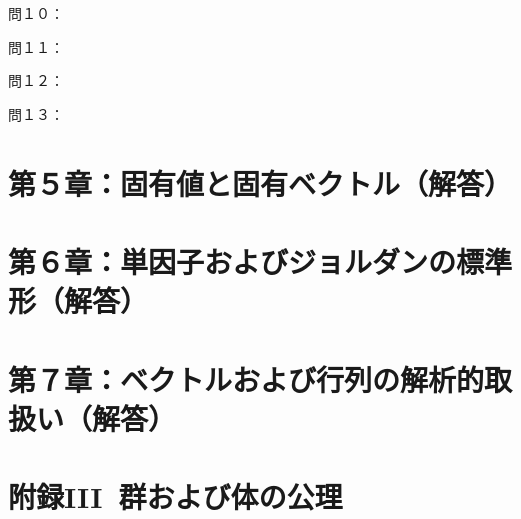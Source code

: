 \documentclass[dvipdfmx,uplatex,11pt]{jsarticle}
\begin{document}
%
%
%
\newpage
%
%
%
\noindent
問１０：




















%
%
%
\newpage
%
%
%
\noindent
問１１：





















%
%
%
\newpage
%
%
%
\noindent
問１２：

















%
%
%
\newpage
%
%
%
問１３：














%
%
%
\newpage
%
%
%
\section{第５章：固有値と固有ベクトル（解答）}
%
%
%
\newpage
%
%
%
\section{第６章：単因子およびジョルダンの標準形（解答）}
%
%
%
\newpage
%
%
%
\section{第７章：ベクトルおよび行列の解析的取扱い（解答）}

%
%
%
\newpage
%
%
%

\section{附録III~群および体の公理}
\end{document}
